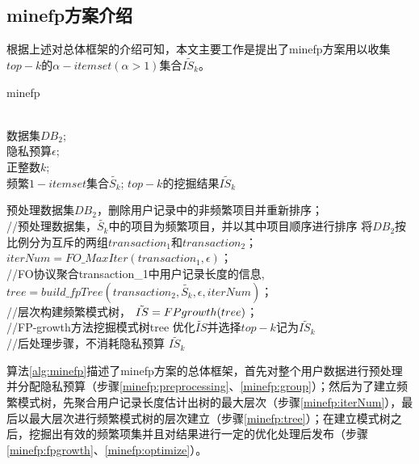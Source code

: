 \documentclass[UTF8]{ctexart}
\begin{document}
\subsection{minefp方案介绍}
\label{section:minefp}
根据上述对总体框架的介绍可知，本文主要工作是提出了minefp方案用以收集$top-k$的$\alpha -itemset(\alpha>1)$集合$\tilde{IS_k}$。

\begin{algorithm}[t]
    \caption{minefp}
    \label{alg:minefp}
        \begin{algorithmic}[1]
			 \REQUIRE ~~\\
			 数据集$DB_2$;\\
			 隐私预算$\epsilon$;\\
			 正整数$k$;\\
			 频繁$1-itemset$集合$\tilde{S_k}$;
			 \ENSURE $top-k$的挖掘结果$\tilde{IS_k}$

                 \STATE 预处理数据集$DB_2$，删除用户记录中的非频繁项目并重新排序； \\ //预处理数据集，$\tilde{S_k}$中的项目为频繁项目，并以其中项目顺序进行排序   
                 \label{minefp:preprocessing} 
                 \STATE 将$DB_2$按比例分为互斥的两组$transaction_1$和$transaction_2$；
                 \label{minefp:group}
			 \STATE $iterNum = FO\_MaxIter(transaction_1,\epsilon)$； \\ //FO协议聚合transaction\_1中用户记录长度的信息,%
			 \label{minefp:iterNum}
			 \STATE $tree = build\_fpTree(transaction_2,\tilde{S_k},\epsilon,iterNum)$； \\ //层次构建频繁模式树，%
			 \label{minefp:tree}
			 \STATE $\tilde{IS} = FP\-growth(tree)$； \\ //FP-growth方法挖掘模式树tree
                 \label{minefp:fpgrowth}
			 \STATE 优化$\tilde{IS}$并选择$top-k$记为$\tilde{IS_k}$ \\ //后处理步骤，不消耗隐私预算
                 \label{minefp:optimize}
                 \RETURN $\tilde{IS_k}$
        \end{algorithmic}
\end{algorithm}


算法\ref{alg:minefp}描述了minefp方案的总体框架，首先对整个用户数据进行预处理并分配隐私预算（步骤\ref{minefp:preprocessing}、\ref{minefp:group}）；然后为了建立频繁模式树，先聚合用户记录长度估计出树的最大层次（步骤\ref{minefp:iterNum}），最后以最大层次进行频繁模式树的层次建立（步骤\ref{minefp:tree}）；在建立模式树之后，挖掘出有效的频繁项集并且对结果进行一定的优化处理后发布（步骤\ref{minefp:fpgrowth}、\ref{minefp:optimize}）。
\end{document}
